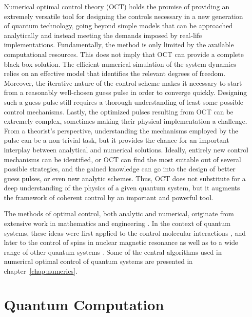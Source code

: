 Numerical optimal control theory (OCT) holds the promise of providing
an extremely versatile tool for designing the controls necessary in a new
generation of quantum technology, going beyond simple models that can be
approached analytically and instead meeting the demands imposed by real-life
implementations. Fundamentally, the method is only limited by the available
computational resources.
This does not imply that OCT can provide a complete black-box solution. The
efficient numerical simulation of the system dynamics relies on an effective
model that identifies the relevant degrees of freedom.
Moreover, the iterative nature of the control scheme makes it necessary to start
from a reasonably well-chosen guess pulse in order to converge quickly.
Designing such a guess pulse still requires a thorough understanding of
least some possible control mechanisms. Lastly, the optimized pulses
resulting from OCT can be extremely complex, sometimes making their physical
implementation a challenge. From a theorist's perspective, understanding
the mechanisms employed by the pulse can be a non-trivial task, but it provides
the chance for an important interplay between analytical and numerical
solutions. Ideally, entirely new control mechanisms can be identified, or OCT
can find the most suitable out of several possible strategies, and the gained
knowledge can go into the design of better guess pulses, or even new analytic
schemes.  Thus, OCT does not substitute for a deep understanding of the physics
of a given quantum system, but it augments the framework of coherent control by
an important and powerful tool.

\enlargethispage{\baselineskip}
The methods of optimal control, both analytic and numerical, originate from
extensive work in mathematics and engineering
\cite{BellmanBook, PontryaginBook, NocedalBook, BoydBandenberghe, KrotovBook}.
In the context of quantum systems, these ideas were first applied
to the control molecular interactions \cite{RiceZhao, BrumerShapiro}, and later
to the control of spins in nuclear magnetic resonance \cite{SkinnerJMR2003,
KhanejaJMR05, TosnerJMR2009} as well as to a wide range of other quantum systems
\cite{BrifNJP2010}.
Some of the central algorithms used in numerical optimal control of quantum
systems are presented in chapter~\ref{chap:numerics}.


\section{Quantum Computation}
\label{sec:intro_qc}

